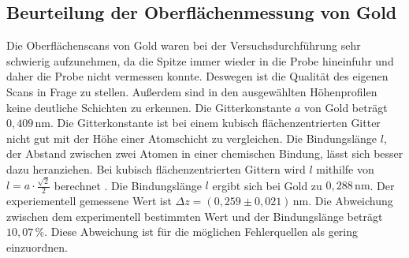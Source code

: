 \subsection{Beurteilung der Oberflächenmessung von Gold}
Die Oberflächenscans von Gold waren bei der Versuchsdurchführung sehr schwierig aufzunehmen, da die Spitze immer wieder in die Probe hineinfuhr und daher die Probe nicht vermessen konnte. Deswegen ist die Qualität des eigenen Scans in Frage zu stellen. Außerdem sind in den ausgewählten Höhenprofilen keine deutliche Schichten zu erkennen. Die Gitterkonstante $a$ von Gold beträgt $0,409 \, \unit{\nano\meter}$. Die Gitterkonstante ist bei einem kubisch flächenzentrierten Gitter nicht gut mit der Höhe einer Atomschicht zu vergleichen. Die Bindungslänge $l$, der Abstand zwischen zwei Atomen in einer chemischen Bindung, lässt sich besser dazu heranziehen. Bei kubisch flächenzentrierten Gittern wird $l$ mithilfe von 
$l = a \cdot \frac{\sqrt{2}}{2}$ berechnet \cite{Bindungslaenge}. Die Bindungslänge $l$ ergibt sich bei Gold zu $0,288 \, \unit{\nano\meter}$. Der experiementell gemessene Wert ist $\Delta z = (0,259 \pm 0,021)\,  \unit{\nano\meter}$. Die Abweichung zwischen dem experimentell bestimmten Wert und der Bindungslänge beträgt $10,07 \, \%$. Diese Abweichung ist für die möglichen Fehlerquellen als gering einzuordnen.
